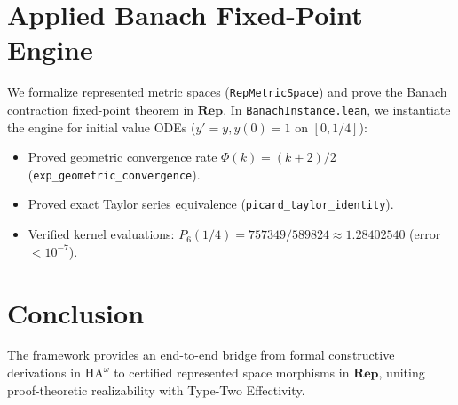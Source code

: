\documentclass[11pt,a4paper]{article}
\theoremstyle{definition}
\theoremstyle{remark}
\newcommand{\HAomega}{\ensuremath{\mathrm{HA}^\omega}}
\newcommand{\Rep}{\ensuremath{\mathbf{Rep}}}
\begin{document}
\section{Applied Banach Fixed-Point Engine}

We formalize represented metric spaces (\texttt{RepMetricSpace}) and prove the Banach contraction fixed-point theorem in $\Rep$. In \texttt{BanachInstance.lean}, we instantiate the engine for initial value ODEs ($y' = y, y(0) = 1$ on $[0, 1/4]$):
\begin{itemize}
    \item Proved geometric convergence rate $\Phi(k) = (k+2)/2$ (\texttt{exp\_geometric\_convergence}).
    \item Proved exact Taylor series equivalence (\texttt{picard\_taylor\_identity}).
    \item Verified kernel evaluations: $P_6(1/4) = 757349/589824 \approx 1.28402540$ (error $< 10^{-7}$).
\end{itemize}

\section{Conclusion}

The framework provides an end-to-end bridge from formal constructive derivations in $\HAomega$ to certified represented space morphisms in $\Rep$, uniting proof-theoretic realizability with Type-Two Effectivity.



\end{document}
